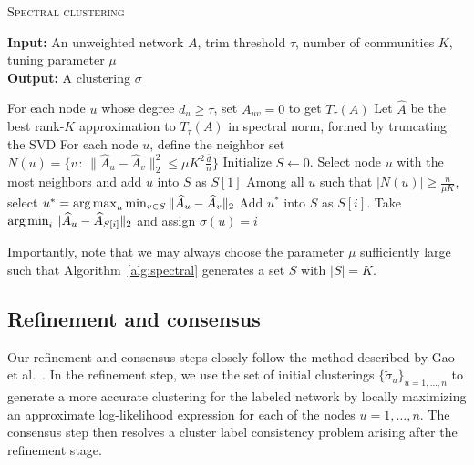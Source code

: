 \documentclass{article}
\begin{document}
\begin{algorithm}[h!]
\caption{\textsc{Spectral clustering}}
\label{alg:spectral}
\textbf{Input:} An unweighted network $A$, trim threshold $\tau$, number of communities $K$, tuning parameter $\mu$ \\
\textbf{Output:} A clustering $\sigma$ \\

\begin{algorithmic}[1]
\State For each node $u$ whose degree $d_u \geq \tau$, set $A_{uv} = 0$ to get $T_{\tau}(A)$
\State Let $\hat{A}$ be the best rank-$K$ approximation to $T_{\tau}(A)$ in spectral norm, formed by truncating the SVD
\State For each node $u$, define the neighbor set $N(u) = \{ v \,:\, \| \hat{A}_u - \hat{A}_v \|_2^2 \leq \mu K^2 \frac{\bar{d}}{n} \}$
\State Initialize $S \leftarrow 0$. Select node $u$ with the most neighbors and add $u$ into $S$ as $S[1]$
    \State Among all $u$ such that $|N(u)| \geq \frac{n}{\mu K}$, select 
           $u^* = \mathop{\text{\rm arg\,max}}_u \min_{v \in S} \| \widehat{A}_u - \widehat{A}_v \|_2$
    \State Add $u^*$ into $S$ as $S[i]$.
\EndFor
{}
    \State Take $\mathop{\text{\rm arg\,min}}_i \| \widehat{A}_u - \widehat{A}_{S[i]} \|_2$ and assign $\sigma(u) = i$
\EndFor
\end{algorithmic}
\end{algorithm}

Importantly, note that we may always choose the parameter $\mu$ sufficiently large such that Algorithm~\ref{alg:spectral} generates a set $S$ with $|S| = K$.

\subsection{Refinement and consensus}

Our refinement and consensus steps closely follow the method described by Gao et al.~\cite{GaoEtal15}. In the refinement step, we use the set of initial clusterings $\{\tilde{\sigma}_u\}_{u=1, \dots, n}$ to generate a more accurate clustering for the labeled network by locally maximizing an approximate log-likelihood expression for each of the nodes $u=1, \dots, n$. The consensus step then resolves a cluster label consistency problem arising after the refinement stage. 
\end{document}
